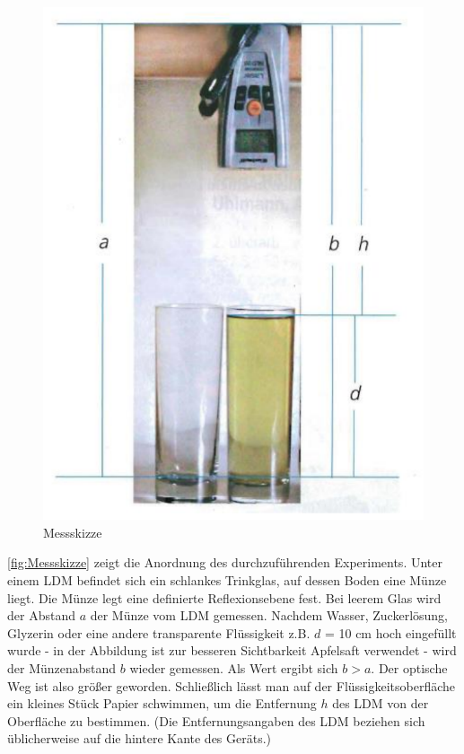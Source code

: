 \documentclass[11pt,ngerman]{scrartcl}
\begin{document}
\begin{figure}
        \centering
        \includegraphics[width=0.9\linewidth]{pics/Messskizze.png}
        \caption{Messskizze}%
        \label{fig:Messskizze}
        \vspace{-2.5cm}
\end{figure}
\autoref{fig:Messskizze} zeigt die Anordnung des durchzuführenden Experiments. Unter einem LDM
befindet sich ein schlankes Trinkglas, auf dessen Boden eine Münze liegt. Die
Münze legt eine definierte Reflexionsebene fest. Bei leerem Glas wird der
Abstand $a$ der Münze vom LDM gemessen. Nachdem Wasser, Zuckerlösung, Glyzerin
oder eine andere transparente Flüssigkeit z.B. $d$ = 10 cm hoch eingefüllt wurde
- in der Abbildung ist zur besseren Sichtbarkeit Apfelsaft verwendet - wird der
Münzenabstand $b$ wieder gemessen. Als Wert ergibt sich $b > a$. Der optische Weg
ist also größer geworden. Schließlich lässt man auf der Flüssigkeitsoberfläche
ein kleines Stück Papier schwimmen, um die Entfernung $h$ des LDM von der
Oberfläche zu bestimmen. (Die Entfernungsangaben des LDM beziehen sich
üblicherweise auf die hintere Kante des Geräts.)
\end{document}
